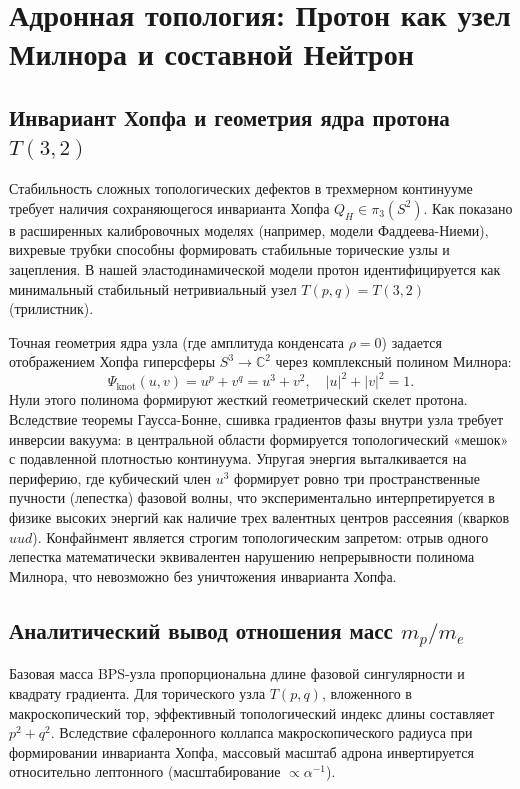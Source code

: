 \documentclass[12pt,a4paper]{article}
\begin{document}
\section{Адронная топология: Протон как узел Милнора и составной Нейтрон}

\subsection{Инвариант Хопфа и геометрия ядра протона $T(3,2)$}
Стабильность сложных топологических дефектов в трехмерном континууме требует наличия сохраняющегося инварианта Хопфа $Q_H \in \pi_3(S^2)$. Как показано в расширенных калибровочных моделях (например, модели Фаддеева-Ниеми), вихревые трубки способны формировать стабильные торические узлы и зацепления.
В нашей эластодинамической модели протон идентифицируется как минимальный стабильный нетривиальный узел $T(p,q) = T(3,2)$ (трилистник). 

Точная геометрия ядра узла (где амплитуда конденсата $\rho = 0$) задается отображением Хопфа гиперсферы $S^3 \to \mathbb{C}^2$ через комплексный полином Милнора:
\begin{equation}
\Psi_{\text{knot}}(u, v) = u^p + v^q = u^3 + v^2, \quad |u|^2 + |v|^2 = 1.
\end{equation}
Нули этого полинома формируют жесткий геометрический скелет протона. Вследствие теоремы Гаусса-Бонне, сшивка градиентов фазы внутри узла требует инверсии вакуума: в центральной области формируется топологический «мешок» с подавленной плотностью континуума. Упругая энергия выталкивается на периферию, где кубический член $u^3$ формирует ровно три пространственные пучности (лепестка) фазовой волны, что экспериментально интерпретируется в физике высоких энергий как наличие трех валентных центров рассеяния (кварков $uud$). Конфайнмент является строгим топологическим запретом: отрыв одного лепестка математически эквивалентен нарушению непрерывности полинома Милнора, что невозможно без уничтожения инварианта Хопфа.

\subsection{Аналитический вывод отношения масс $m_p/m_e$}
Базовая масса BPS-узла пропорциональна длине фазовой сингулярности и квадрату градиента. Для торического узла $T(p,q)$, вложенного в макроскопический тор, эффективный топологический индекс длины составляет $p^2 + q^2$. Вследствие сфалеронного коллапса макроскопического радиуса при формировании инварианта Хопфа, массовый масштаб адрона инвертируется относительно лептонного (масштабирование $\propto \alpha^{-1}$).
\end{document}
